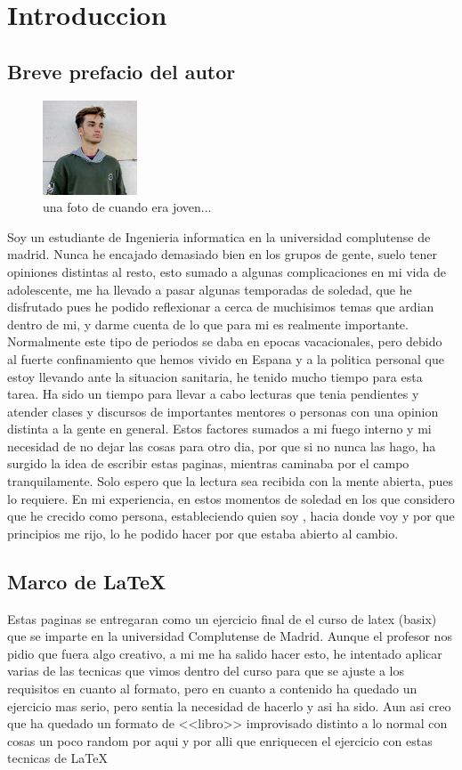 
\chapter{Introduccion}
\section{Breve prefacio del autor}
\begin{figure}
	\centering
	\includegraphics[width=0.25\textwidth]{figures/mi_foto.jpeg}
	\caption{una foto de cuando era joven...}
\end{figure}

Soy un estudiante de Ingenieria informatica en la universidad complutense de madrid. Nunca he encajado demasiado bien en los grupos de gente, suelo tener opiniones distintas al resto, esto sumado a algunas complicaciones en mi vida de adolescente, me ha llevado a pasar algunas temporadas de soledad, que he disfrutado pues he podido reflexionar a cerca de muchisimos temas que ardian dentro de mi, y darme cuenta de lo que para mi es realmente importante. 
Normalmente este tipo de periodos se daba en epocas vacacionales, pero debido al fuerte confinamiento que hemos vivido en Espana y a la politica personal que estoy llevando ante la situacion sanitaria, he tenido mucho tiempo para esta tarea. Ha sido un tiempo para llevar a cabo lecturas que tenia pendientes y atender clases y discursos de importantes mentores o personas con una opinion distinta a la gente en general.
Estos factores sumados a mi fuego interno y mi necesidad de no dejar las cosas para otro dia, por que si no nunca las hago, ha surgido la idea de escribir estas paginas, mientras caminaba por el campo tranquilamente.
Solo espero que la lectura sea recibida con la mente abierta, pues lo requiere. En mi experiencia, en estos momentos de soledad en los que considero que he crecido como persona, estableciendo quien soy , hacia donde voy y por que principios me rijo, lo he podido hacer por que estaba abierto al cambio. 
\section{Marco de \LaTeX}
Estas paginas se entregaran como un ejercicio final de el curso de latex (basix) que se imparte en la universidad Complutense de Madrid. Aunque el profesor nos pidio que fuera algo creativo, a mi me ha salido hacer esto, he intentado aplicar varias de las tecnicas que vimos dentro del curso para que se ajuste a los requisitos en cuanto al formato, pero en cuanto a contenido ha quedado un ejercicio mas serio, pero sentia la necesidad de hacerlo y asi ha sido. Aun asi creo que ha quedado un formato de <<libro>> improvisado distinto a lo normal con cosas un poco random por aqui y por alli que enriquecen el ejercicio con estas tecnicas de \LaTeX \\

